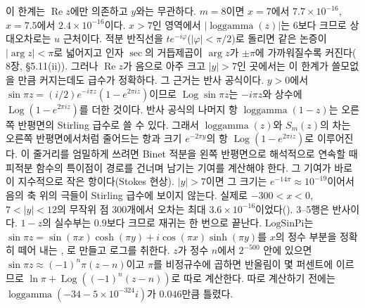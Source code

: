 이 한계는 $\operatorname{Re}z$에만 의존하고 $y$와는 무관하다. $m=8$이면 $x=7$에서 $7.7\times10^{-16}$, $x=7.5$에서 $2.4\times10^{-16}$이다. $x>7$인 영역에서 $|\operatorname{loggamma}(z)|$는 $6$보다 크므로 상대오차로는 $u$ 근처이다. 적분 반직선을 $te^{-i\varphi}$($|\varphi|<\pi/2$)로 돌리면 같은 논증이 $|\arg z|<\pi$로 넓어지고 인자 $\sec$의 거듭제곱이 $\arg z$가 $\pm\pi$에 가까워질수록 커진다(\cite{olver1974asymptotics} 8장, \cite{dlmf} §5.11(ii)). 그러나 $\operatorname{Re}z$가 음으로 아주 크고 $|y|>7$인 곳에서는 이 한계가 쓸모없을 만큼 커지는데도 급수가 정확하다. 그 근거는 반사 공식이다. $y>0$에서 $\sin\pi z=(i/2)e^{-i\pi z}(1-e^{2\pi iz})$이므로 $\operatorname{Log}\sin\pi z$는 $-i\pi z$와 상수에 $\operatorname{Log}(1-e^{2\pi iz})$를 더한 것이다. 반사 공식의 나머지 항 $\operatorname{loggamma}(1-z)$는 오른쪽 반평면의 Stirling 급수로 쓸 수 있다. 그래서 $\operatorname{loggamma}(z)$와 $S_m(z)$의 차는 오른쪽 반평면에서처럼 줄어드는 항과 크기 $e^{-2\pi y}$의 항 $\operatorname{Log}(1-e^{2\pi iz})$로 이루어진다. 이 줄거리를 엄밀하게 쓰려면 Binet 적분을 왼쪽 반평면으로 해석적으로 연속할 때 피적분 함수의 특이점이 경로를 건너며 남기는 기여를 계산해야 한다. 그 기여가 바로 이 지수적으로 작은 항이다(Stokes 현상). $|y|>7$이면 그 크기는 $e^{-14\pi}\approx10^{-19}$이어서 음의 축 위의 극들이 Stirling 급수에 보이지 않는다. 실제로 $-300<x<0$, $7<|y|<12$의 무작위 점 $300$개에서 오차는 최대 $3.6\times10^{-16}$이었다(). 3--5행은 반사이다. $1-z$의 실수부는 $0.9$보다 크므로 재귀는 한 번으로 끝난다. $\textrm{LogSinPi}$는 $\sin\pi z=\sin(\pi x)\cosh(\pi y)+i\cos(\pi x)\sinh(\pi y)$를 $x$의 정수 부분을 정확히 떼어 내는 , 로 만들고 로그를 취한다. $z$가 정수 $n$에서 $2^{-500}$ 안에 있으면 $\sin\pi z\approx(-1)^n\pi(z-n)$이고 $\pi$를 비정규수에 곱하면 반올림이 몇 퍼센트에 이르므로 $\ln\pi+\operatorname{Log}((-1)^n(z-n))$로 따로 계산한다. 따로 계산하기 전에는 $\operatorname{loggamma}(-34-5\times10^{-324}i)$가 $0.046$만큼 틀렸다.

